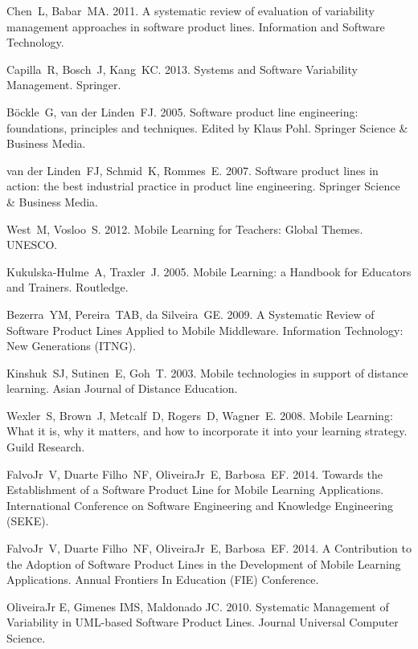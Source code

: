 \documentclass[preprint,12pt]{elsarticle}
\begin{document}
\begin{thebibliography}{33}

 Chen~L, Babar~MA. 2011. A systematic review of evaluation of variability management approaches in software product lines. Information and Software Technology.

 Capilla~R, Bosch~J, Kang~KC. 2013. Systems and Software Variability Management. Springer.

 B\"{o}ckle~G, van der Linden~FJ. 2005. Software product line engineering: foundations, principles and techniques. Edited by Klaus Pohl. Springer Science \& Business Media.

 van der Linden~FJ, Schmid~K, Rommes~E. 2007. Software product lines in action: the best industrial practice in product line engineering. Springer Science \& Business Media.

 West~M, Vosloo~S. 2012. Mobile Learning for Teachers: Global Themes. UNESCO.

 Kukulska-Hulme~A, Traxler~J. 2005. Mobile Learning: a Handbook for Educators and Trainers. Routledge.

 Bezerra~YM, Pereira~TAB, da Silveira~GE. 2009. A Systematic Review of Software Product Lines Applied to Mobile Middleware. Information Technology: New Generations (ITNG).

 Kinshuk~SJ, Sutinen~E, Goh~T. 2003. Mobile technologies in support of distance learning. Asian Journal of Distance Education.

 Wexler~S, Brown~J, Metcalf~D, Rogers~D, Wagner~E. 2008. Mobile Learning: What it is, why it matters, and how to incorporate it into your learning strategy. Guild Research.

 FalvoJr~V, Duarte Filho~NF, OliveiraJr~E, Barbosa~EF. 2014. Towards the Establishment of a Software Product Line for Mobile Learning Applications. International Conference on Software Engineering and Knowledge Engineering (SEKE).

 FalvoJr~V, Duarte Filho~NF, OliveiraJr~E, Barbosa~EF. 2014. A Contribution to the Adoption of Software Product Lines in the Development of Mobile Learning Applications. Annual Frontiers In Education (FIE) Conference.

 OliveiraJr E, Gimenes IMS, Maldonado JC. 2010. Systematic Management of Variability in UML-based Software Product Lines. Journal Universal Computer Science.


\end{thebibliography}
\end{document}
